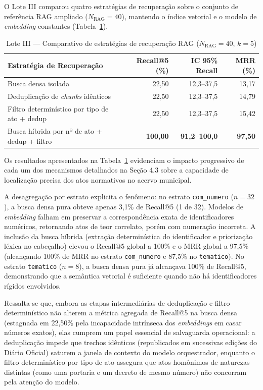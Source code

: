 \documentclass[12pt]{article}
\begin{document}
O Lote III comparou quatro estratégias de recuperação sobre o conjunto de referência RAG ampliado ($N_{\text{RAG}} = 40$), mantendo o índice vetorial e o modelo de \textit{embedding} constantes (Tabela~\ref{tab:lote3}).

\begin{table}[htbp]
\centering
\caption{Lote III --- Comparativo de estratégias de recuperação RAG ($N_{\text{RAG}} = 40$, $k = 5$)}
\label{tab:lote3}
\small
\begin{tabular}{lrrr}
\toprule
\textbf{Estratégia de Recuperação} & \textbf{Recall@5 (\%)} & \textbf{IC 95\% Recall} & \textbf{MRR (\%)} \\
\midrule
Busca densa isolada & 22,50 & 12,3--37,5 & 13,17 \\
Deduplicação de \textit{chunks} idênticos & 22,50 & 12,3--37,5 & 14,79 \\
Filtro determinístico por tipo de ato + dedup & 22,50 & 12,3--37,5 & 15,42 \\
Busca híbrida por nº de ato + dedup + filtro & \textbf{100,00} & \textbf{91,2--100,0} & \textbf{97,50} \\
\bottomrule
\end{tabular}
\end{table}

\newpage
Os resultados apresentados na Tabela~\ref{tab:lote3} evidenciam o impacto progressivo de cada um dos mecanismos detalhados na Seção 4.3 sobre a capacidade de localização precisa dos atos normativos no acervo municipal.

A desagregação por estrato explicita o fenômeno: no estrato \texttt{com\_numero} ($n = 32$), a busca densa pura obteve apenas 3,1\% de Recall@5 (1 de 32). Modelos de \textit{embedding} falham em preservar a correspondência exata de identificadores numéricos, retornando atos de teor correlato, porém com numeração incorreta. A inclusão da busca híbrida (extração determinística do identificador e priorização léxica no cabeçalho) elevou o Recall@5 global a 100\% e o MRR global a 97,5\% (alcançando 100\% de MRR no estrato \texttt{com\_numero} e 87,5\% no \texttt{tematico}). No estrato \texttt{tematico} ($n = 8$), a busca densa pura já alcançava 100\% de Recall@5, demonstrando que a semântica vetorial é suficiente quando não há identificadores rígidos envolvidos.

Ressalta-se que, embora as etapas intermediárias de deduplicação e filtro determinístico não alterem a métrica agregada de Recall@5 na busca densa (estagnada em 22,50\% pela incapacidade intrínseca dos \textit{embeddings} em casar números exatos), elas cumprem um papel essencial de salvaguarda operacional: a deduplicação impede que trechos idênticos (republicados em sucessivas edições do Diário Oficial) saturem a janela de contexto do modelo orquestrador, enquanto o filtro determinístico por tipo de ato assegura que atos homônimos de naturezas distintas (como uma portaria e um decreto de mesmo número) não concorram pela atenção do modelo.
\end{document}
